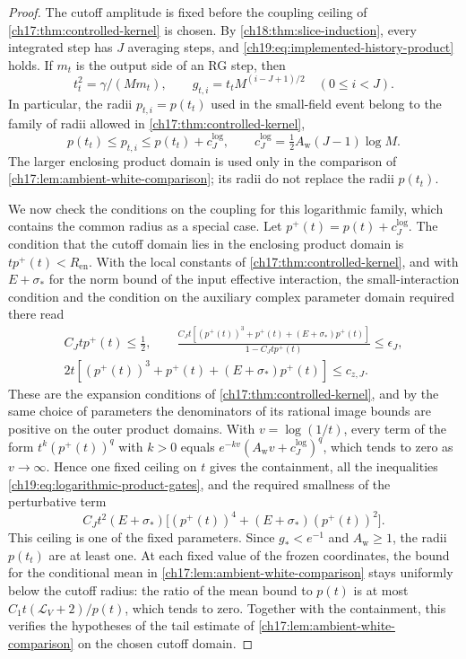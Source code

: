 \begin{proof}
The cutoff amplitude is fixed before the coupling ceiling of \cref{ch17:thm:controlled-kernel} is chosen. By \cref{ch18:thm:slice-induction}, every integrated step has $J$ averaging steps, and \eqref{ch19:eq:implemented-history-product} holds. If $m_t$ is the output side of an RG step, then
\[
 t_t^2=\gamma/(Mm_t),\qquad g_{t,i}=t_tM^{(i-J+1)/2}\quad(0\le i<J).
\]
In particular, the radii $p_{t,i}=p(t_t)$ used in the small-field event belong to the family of radii allowed in \cref{ch17:thm:controlled-kernel},
\[
 p(t_t)\le p_{t,i}\le p(t_t)+c_J^{\log},\qquad c_J^{\log}=\tfrac12A_{\mathrm w}(J-1)\log M.
\]
The larger enclosing product domain is used only in the comparison of \cref{ch17:lem:ambient-white-comparison}; its radii do not replace the radii $p(t_t)$.

We now check the conditions on the coupling for this logarithmic family, which contains the common radius as a special case. Let $p^+(t)=p(t)+c_J^{\log}$. The condition that the cutoff domain lies in the enclosing product domain is $tp^+(t)<R_{\mathrm{en}}$. With the local constants of \cref{ch17:thm:controlled-kernel}, and with $E+\sigma_*$ for the norm bound of the input effective interaction, the small-interaction condition and the condition on the auxiliary complex parameter domain required there read
\begin{equation}\label{ch19:eq:logarithmic-product-gates}
 \begin{gathered}
 C_Jtp^+(t)\le\tfrac12,\qquad
 \frac{C_Jt[(p^+(t))^3+p^+(t)+(E+\sigma_*)p^+(t)]}{1-C_Jtp^+(t)}\le\epsilon_J,\\
 2t[(p^+(t))^3+p^+(t)+(E+\sigma_*)p^+(t)]\le c_{z,J}.
 \end{gathered}
\end{equation}
These are the expansion conditions of \cref{ch17:thm:controlled-kernel}, and by the same choice of parameters the denominators of its rational image bounds are positive on the outer product domains. With $v=\log(1/t)$, every term of the form $t^k(p^+(t))^q$ with $k>0$ equals $e^{-kv}(A_{\mathrm w}v+c_J^{\log})^q$, which tends to zero as $v\to\infty$. Hence one fixed ceiling on $t$ gives the containment, all the inequalities \eqref{ch19:eq:logarithmic-product-gates}, and the required smallness of the perturbative term
\[
 C_Jt^2(E+\sigma_*)\bigl[(p^+(t))^4+(E+\sigma_*)(p^+(t))^2\bigr].
\]
This ceiling is one of the fixed parameters. Since $g_*<e^{-1}$ and $A_{\mathrm w}\ge1$, the radii $p(t_t)$ are at least one. At each fixed value of the frozen coordinates, the bound for the conditional mean in \cref{ch17:lem:ambient-white-comparison} stays uniformly below the cutoff radius: the ratio of the mean bound to $p(t)$ is at most $C_1t(\mathcal L_V+2)/p(t)$, which tends to zero. Together with the containment, this verifies the hypotheses of the tail estimate of \cref{ch17:lem:ambient-white-comparison} on the chosen cutoff domain.


\end{proof}
